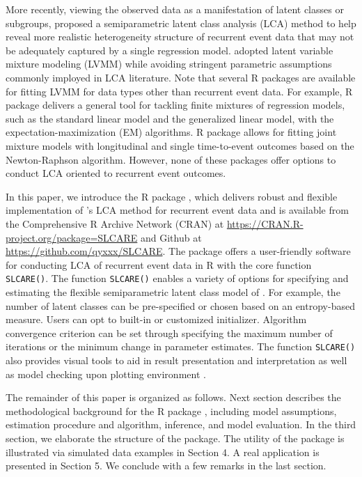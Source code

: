 More recently, viewing the observed data as a manifestation of latent classes or subgroups, \citet{zhao2022semiparametric} proposed a semiparametric latent class analysis (LCA) method to help reveal more realistic heterogeneity structure of recurrent event data that may not be adequately captured by a single regression model.
\citet{zhao2022semiparametric} adopted latent variable mixture modeling (LVMM) while avoiding stringent parametric assumptions commonly imployed in LCA literature. Note that several R packages are available for fitting LVMM for data types other than recurrent event data. For example, R package  \citep{flexmix} delivers a general tool for tackling finite mixtures of regression models, such as the standard linear model and the generalized linear model, with the expectation-maximization (EM) algorithms. R package  \citep{lcmm} allows for fitting joint mixture models with longitudinal and single time-to-event outcomes based on the Newton-Raphson algorithm. However, none of these packages offer options to conduct LCA oriented to recurrent event outcomes.

In this paper, we introduce the R package , which delivers robust and flexible implementation of \citet{zhao2022semiparametric} 's LCA method for recurrent event data and is available from the Comprehensive R Archive Network (CRAN) at
\url{https://CRAN.R-project.org/package=SLCARE} and Github at
\url{https://github.com/qyxxx/SLCARE}. The package 
offers a user-friendly software for conducting LCA of recurrent event data in R with the core function \texttt{SLCARE()}. The function \texttt{SLCARE()} enables a variety of
options for specifying and estimating the flexible semiparametric latent class model of \citet{zhao2022semiparametric} . For example, the number of latent classes can be pre-specified or chosen based on an entropy-based measure. Users can opt to built-in or customized initializer. Algorithm convergence criterion can be set through specifying the maximum number of iterations or the minimum change in parameter estimates. The function \texttt{SLCARE()} also provides visual tools to aid in result presentation and interpretation as well as model checking upon  plotting environment \citep{ggplot2}.

The remainder of this paper is organized as follows. Next section describes the methodological background for the R package , including model assumptions, estimation procedure and algorithm, inference, and model evaluation. In the third section, we elaborate the structure of the package. The utility of the package is illustrated via simulated data examples in Section 4. A real application is presented in Section 5. We conclude with a few remarks in the last section.

